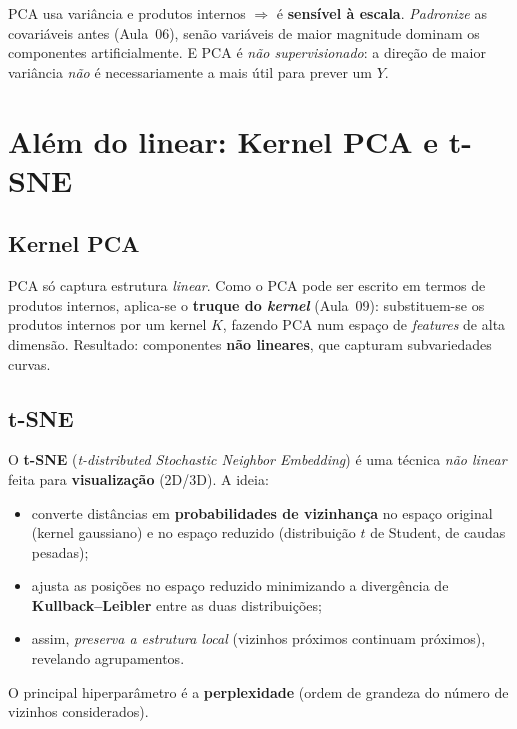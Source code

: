 \documentclass[11pt,a4paper]{article}
\begin{document}
\begin{atencao}
PCA usa variância e produtos internos $\Rightarrow$ é \textbf{sensível à escala}.
\emph{Padronize} as covariáveis antes (Aula~06), senão variáveis de maior magnitude
dominam os componentes artificialmente. E PCA é \emph{não supervisionado}: a direção
de maior variância \emph{não} é necessariamente a mais útil para prever um $Y$.
\end{atencao}

\section{Além do linear: Kernel PCA e t-SNE}
\subsection{Kernel PCA}
PCA só captura estrutura \emph{linear}. Como o PCA pode ser escrito em termos de
produtos internos, aplica-se o \textbf{truque do \emph{kernel}} (Aula~09):
substituem-se os produtos internos por um kernel $K$, fazendo PCA num espaço de
\emph{features} de alta dimensão. Resultado: componentes \textbf{não lineares}, que
capturam subvariedades curvas.

\subsection{t-SNE}
O \textbf{t-SNE} (\emph{t-distributed Stochastic Neighbor Embedding}) é uma técnica
\emph{não linear} feita para \textbf{visualização} (2D/3D). A ideia:
\begin{itemize}[leftmargin=1.4cm,nosep]
  \item converte distâncias em \textbf{probabilidades de vizinhança} no espaço
        original (kernel gaussiano) e no espaço reduzido (distribuição $t$ de
        Student, de caudas pesadas);
  \item ajusta as posições no espaço reduzido minimizando a divergência de
        \textbf{Kullback--Leibler} entre as duas distribuições;
  \item assim, \emph{preserva a estrutura local} (vizinhos próximos continuam
        próximos), revelando agrupamentos.
\end{itemize}
O principal hiperparâmetro é a \textbf{perplexidade} (ordem de grandeza do número de
vizinhos considerados).
\end{document}
